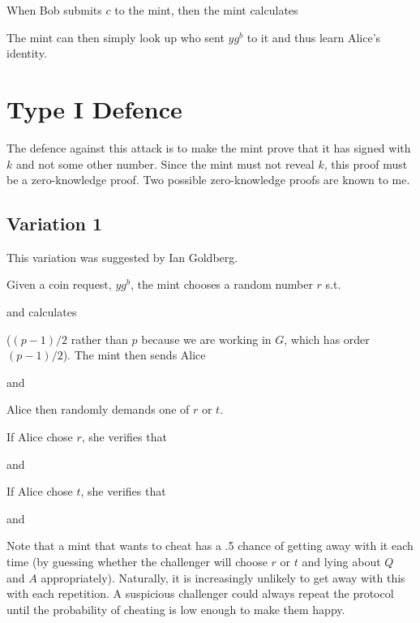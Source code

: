 \documentclass[a4paper,titlepage]{article}
\begin{document}

When Bob submits $c$ to the mint, then the mint calculates


The mint can then simply look up who sent $y g^b$ to it and thus learn
Alice's identity.

\section{Type I Defence}

The defence against this attack is to make the mint prove that it has
signed with $k$ and not some other number. Since the mint must not
reveal $k$, this proof must be a zero-knowledge proof. Two possible
zero-knowledge proofs are known to me.

\subsection{Variation 1}

This variation was suggested by Ian Goldberg.

Given a coin request, $y g^b$, the mint chooses a random number $r$
 s.t.


and calculates


($(p-1)/2$ rather than $p$ because we are working in $G$, which has order
$(p-1)/2$). The mint then sends Alice


and


Alice then randomly demands one of $r$ or $t$.

If Alice chose $r$, she verifies that


and


If Alice chose $t$, she verifies that


and


Note that a mint that wants to cheat has a .5 chance of getting away
with it each time (by guessing whether the challenger will choose $r$
or $t$ and lying about $Q$ and $A$ appropriately). Naturally, it is
increasingly unlikely to get away with this with each repetition. A
suspicious challenger could always repeat the protocol until the
probability of cheating is low enough to make them happy.
\end{document}
